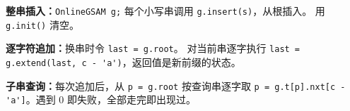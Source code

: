 \noindent\textbf{整串插入：}\verb|OnlineGSAM g;| 每个小写串调用 \verb|g.insert(s)|，从根插入。
用 \verb|g.init()| 清空。\par
\noindent\textbf{逐字符追加：}换串时令 \verb|last = g.root|。
对当前串逐字执行 \verb|last = g.extend(last, c - 'a')|，返回值是新前缀的状态。\par
\noindent\textbf{子串查询：}每次追加后，从 \verb|p = g.root| 按查询串逐字取
\verb|p = g.t[p].nxt[c - 'a']|。遇到 $0$ 即失败，全部走完即出现过。\par
